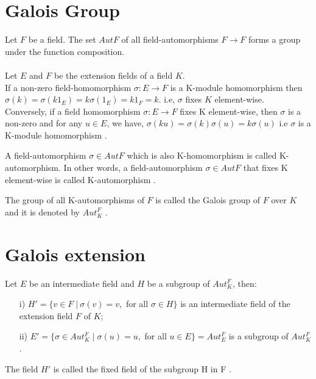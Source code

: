 \section{Galois Group}
Let \(F\) be a field. The set \(AutF\) of all field-automorphisms \(F \rightarrow F \) forms a group under the function composition.\\ \\
Let \(E\) and \(F\) be the extension fields of a field \(K\).\\
If a non-zero field-homomorphism \(\sigma : E \rightarrow F\) is a K-module homomorphism then\\
\(\sigma(k)=\sigma(k1_E)=k\sigma(1_E)=k1_F=k\).\hspace{7mm}
i.e, \(\sigma\) fixes \(K\) element-wise.\\
Conversely, if a field homomorphism \(\sigma : E \rightarrow F\) fixes K element-wise, then \(\sigma\) is a non-zero and for any \(u \in E\), we have, \(\sigma(ku)=\sigma(k)\sigma(u)=k\sigma(u)\)
i.e \(\sigma\) is a K-module homomorphism \cite{hunger}.
\begin{definition}
  A field-automorphism \(\sigma \in Aut F\) which is also K-homomorphism is called K-automorphism. In other words, a field-automorphism \(\sigma \in Aut F\) that fixes K element-wise is called K-automorphism \cite{hunger}.
\end{definition}

\begin{definition}
  The group of all K-automorphisms of \(F\) is called the Galois group of \(F\) over \(K\) and it is denoted by \(Aut_K^F\) \cite{hunger}.
\end{definition}

\section{Galois extension}
Let \(E\) be an intermediate field and \(H\) be a subgroup of \(Aut_K^F\), then:
\begin{enumerate}
\item[i)] \(H' = \{v \in F \; | \: \sigma(v)=v,\) for all \(\sigma \in H \}\) is an intermediate field of the extension field \(F\) of \(K\);
\item[ii)] \(E' = \{\sigma \in Aut_K^F \; | \; \sigma(u)=u,\) for all \(u \in E\}=Aut_E^F\) is a subgroup of \(Aut_K^F\).
\end{enumerate}

The field \(H'\) is called the fixed field of the subgroup H in F \cite{hunger}.


